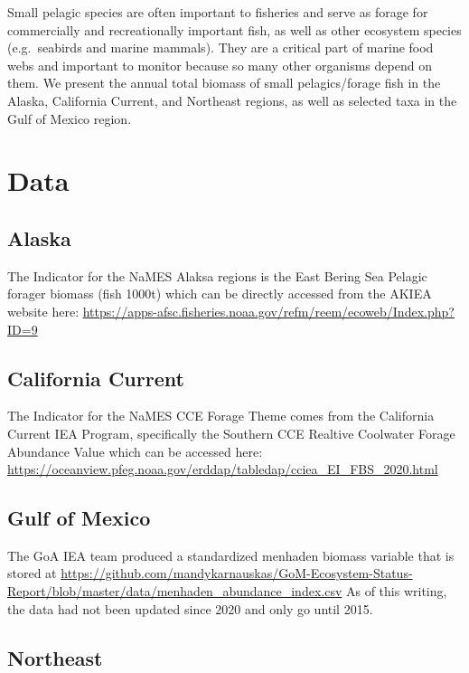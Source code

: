 \documentclass[
]{book}
\begin{document}
Small pelagic species are often important to fisheries and serve as forage for commercially and recreationally important fish, as well as other ecosystem species (e.g.~seabirds and marine mammals). They are a critical part of marine food webs and important to monitor because so many other organisms depend on them. We present the annual total biomass of small pelagics/forage fish in the Alaska, California Current, and Northeast regions, as well as selected taxa in the Gulf of Mexico region.

\hypertarget{data-2}{%
\section{Data}\label{data-2}}

\hypertarget{alaska}{%
\subsection{Alaska}\label{alaska}}

The Indicator for the NaMES Alaksa regions is the East Bering Sea Pelagic forager biomass (fish 1000t) which can be directly accessed from the AKIEA website here: \url{https://apps-afsc.fisheries.noaa.gov/refm/reem/ecoweb/Index.php?ID=9}

\hypertarget{california-current}{%
\subsection{California Current}\label{california-current}}

The Indicator for the NaMES CCE Forage Theme comes from the California Current IEA Program, specifically the Southern CCE Realtive Coolwater Forage Abundance Value which can be accessed here: \url{https://oceanview.pfeg.noaa.gov/erddap/tabledap/cciea_EI_FBS_2020.html}

\hypertarget{gulf-of-mexico}{%
\subsection{Gulf of Mexico}\label{gulf-of-mexico}}

The GoA IEA team produced a standardized menhaden biomass variable that is stored at \url{https://github.com/mandykarnauskas/GoM-Ecosystem-Status-Report/blob/master/data/menhaden_abundance_index.csv} As of this writing, the data had not been updated since 2020 and only go until 2015.

\hypertarget{northeast}{%
\subsection{Northeast}\label{northeast}}
\end{document}
